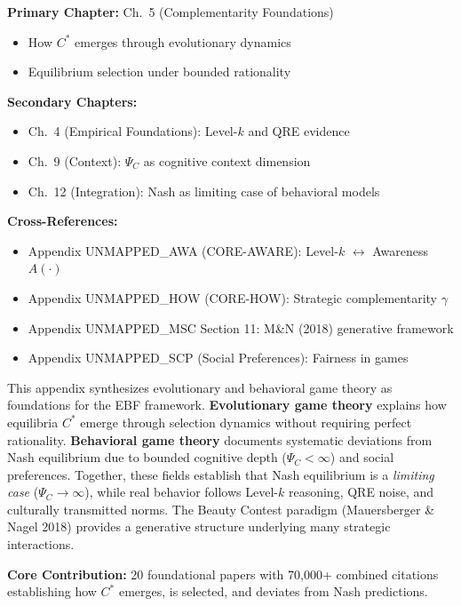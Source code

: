 \begin{tcolorbox}[colback=green!5!white, colframe=green!75!black,
    title=\textbf{Chapter References}]

\textbf{Primary Chapter:} Ch.\ 5 (Complementarity Foundations)
\begin{itemize}[nosep]
    \item How $C^*$ emerges through evolutionary dynamics
    \item Equilibrium selection under bounded rationality
\end{itemize}

\textbf{Secondary Chapters:}
\begin{itemize}[nosep]
    \item Ch.\ 4 (Empirical Foundations): Level-$k$ and QRE evidence
    \item Ch.\ 9 (Context): $\Psi_C$ as cognitive context dimension
    \item Ch.\ 12 (Integration): Nash as limiting case of behavioral models
\end{itemize}

\textbf{Cross-References:}
\begin{itemize}[nosep]
    \item Appendix UNMAPPED_AWA (CORE-AWARE): Level-$k$ $\leftrightarrow$ Awareness $A(\cdot)$
    \item Appendix UNMAPPED_HOW (CORE-HOW): Strategic complementarity $\gamma$
    \item Appendix UNMAPPED_MSC Section 11: M\&N (2018) generative framework
    \item Appendix UNMAPPED_SCP (Social Preferences): Fairness in games
\end{itemize}

\end{tcolorbox}

\begin{tcolorbox}[colback=blue!5!white, colframe=blue!75!black,
    title=\textbf{Abstract}]

This appendix synthesizes evolutionary and behavioral game theory as foundations
for the EBF framework. \textbf{Evolutionary game theory} explains how equilibria
$C^*$ emerge through selection dynamics without requiring perfect rationality.
\textbf{Behavioral game theory} documents systematic deviations from Nash equilibrium
due to bounded cognitive depth ($\Psi_C < \infty$) and social preferences.
Together, these fields establish that Nash equilibrium is a \textit{limiting case}
($\Psi_C \to \infty$), while real behavior follows Level-$k$ reasoning,
QRE noise, and culturally transmitted norms. The Beauty Contest paradigm
(Mauersberger \& Nagel 2018) provides a generative structure underlying
many strategic interactions.

\textbf{Core Contribution:} 20 foundational papers with 70,000+ combined citations
establishing how $C^*$ emerges, is selected, and deviates from Nash predictions.

\end{tcolorbox}

